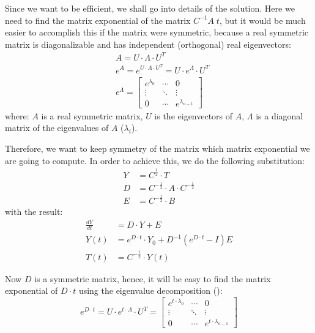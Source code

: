 Since we want to be efficient, we shall go into details of the solution. Here we need to find the matrix exponential of the matrix $C^{-1} A \; t$, but it would be much easier to accomplish this if the matrix were symmetric, because a real symmetric matrix is diagonalizable and has independent (orthogonal) real eigenvectors:
\begin{align}
  & A = U \cdot \Lambda \cdot U^T \label{eq:eigenvalue-decomposition} \\
  & e^A = e^{U \cdot \Lambda \cdot U^T} = U \cdot e^{\Lambda} \cdot U^T \nonumber \\
  & e^{\Lambda} = \left[
      \begin{array}{ccc}
        e^{\lambda_0} & \cdots & 0 \\
        \vdots & \ddots & \vdots \\
        0 & \cdots & e^{\lambda_{n - 1}}
      \end{array}
    \right] \nonumber
\end{align}
where: $A$ is a real symmetric matrix, $U$ is the eigenvectors of $A$, $\Lambda$ is a diagonal matrix of the eigenvalues of $A$ ($\lambda_i$).

Therefore, we want to keep symmetry of the matrix which matrix exponential we are going to compute. In order to achieve this, we do the following substitution:
\begin{align*}
  Y & = C^{\frac{1}{2}} \cdot T \\
  D & = C^{-\frac{1}{2}} \cdot A \cdot C^{-\frac{1}{2}} \\
  E & = C^{-\frac{1}{2}} \cdot B
\end{align*}
with the result:
\begin{align}
  \frac{dY}{dt} & = D \cdot Y + E \nonumber \\
  Y(t) & = e^{D \cdot t} \cdot Y_{0} + D^{-1}(e^{D \cdot t} - I)E \label{eq:modified-solution} \\
  T(t) & = C^{-\frac{1}{2}} \cdot Y(t) \nonumber
\end{align}

Now $D$ is a symmetric matrix, hence, it will be easy to find the matrix exponential of $D \cdot t$ using the eigenvalue decomposition ():
\[
  e^{D \cdot t} = U \cdot e^{t \cdot \Lambda} \cdot U^T = \left[
      \begin{array}{ccc}
        e^{t \cdot \lambda_0} & \cdots & 0 \\
        \vdots & \ddots & \vdots \\
        0 & \cdots & e^{t \cdot \lambda_{n - 1}}
      \end{array}
    \right]
\]

